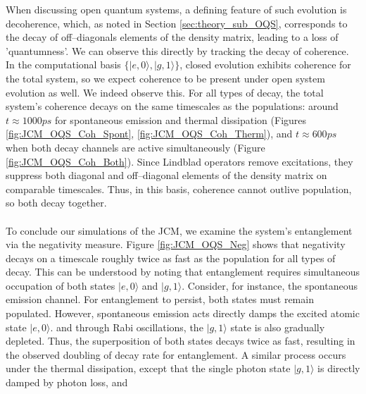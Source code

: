 \documentclass[11pt]{article}
\begin{document}
\noindent When discussing open quantum systems, a defining feature of such evolution is decoherence, which, as noted in Section \ref{sec:theory_sub_OQS}, corresponds to the decay of off--diagonals elements of the density matrix, leading to a loss of 'quantumness'. We can observe this directly by tracking the decay of coherence. In the computational basis $\{|e,0\rangle, |g,1\rangle\}$, closed evolution exhibits coherence for the total system, so we expect coherence to be present under open system evolution as well. We indeed observe this. For all types of decay, the total system's coherence decays on the same timescales as the populations: around $t \approx 1000ps$ for spontaneous emission and thermal dissipation (Figures \ref{fig:JCM_OQS_Coh_Spont}, \ref{fig:JCM_OQS_Coh_Therm}), and $ t \approx 600ps$ when both decay channels are active simultaneously (Figure \ref{fig:JCM_OQS_Coh_Both}). Since Lindblad operators remove excitations, they suppress both diagonal and off--diagonal elements of the density matrix on comparable timescales. Thus, in this basis, coherence cannot outlive population, so both decay together. \\
\\
To conclude our simulations of the JCM, we examine the system's entanglement via the negativity measure. Figure \ref{fig:JCM_OQS_Neg} shows that negativity decays on a timescale roughly twice as fast as the population for all types of decay. This can be understood by noting that entanglement requires simultaneous occupation of both states $|e,0\rangle$ and $|g,1\rangle$. Consider, for instance, the spontaneous emission channel. For entanglement to persist, both states must remain populated. However, spontaneous emission acts directly damps the excited atomic state $|e,0\rangle$.  and through Rabi oscillations, the $|g,1\rangle$ state is also gradually depleted. Thus, the superposition of both states decays twice as fast, resulting in the observed doubling of decay rate for entanglement. A similar process occurs under the thermal dissipation, except that the single photon state $|g,1\rangle$ is directly damped by photon loss, and
\end{document}
